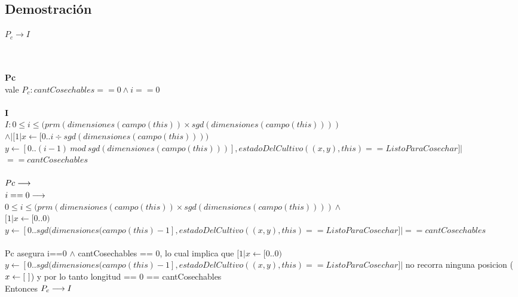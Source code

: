 \documentclass[a4paper]{article}
\begin{document}
    \subsection{Demostraci\'on}
        \noindent
        \begin{large}
       {$P_c \rightarrow I$}
        \end{large} \\
        \\
        \textbf{Pc} \\
        vale $ P_c : cantCosechables == 0 \land i == 0$ \\
        \\
		\textbf{I} \\
        $ I: 0 \leq i \leq (prm(dimensiones(campo(this)) \times sgd(dimensiones(campo(this)))) $\\ $ \land | [1| x \leftarrow [0..i \div sgd(dimensiones(campo(this)))) $\\ $ y \leftarrow [0.. (i-1) \ mod \ sgd(dimensiones(campo(this)))], estadoDelCultivo((x,y), this) == ListoParaCosechar]| $\\$ == cantCosechables $\\   
\\ $Pc \longrightarrow$\\
$i == 0 \longrightarrow$\\
$ 0 \leq i \leq (prm(dimensiones(campo(this)) \times sgd(dimensiones(campo(this)))) \land $\\$
[1| x \leftarrow [0..0) $\\ $ y \leftarrow [0.. sgd(dimensiones(campo(this) - 1], estadoDelCultivo((x,y), this) == ListoParaCosechar]| == cantCosechables$\\
\\ Pc asegura i==0 $ \land $ cantCosechables == 0, lo cual implica que $ [1| x \leftarrow [0..0) $\\ $ y \leftarrow [0.. sgd(dimensiones(campo(this) - 1], estadoDelCultivo((x,y), this) == ListoParaCosechar]|$ no recorra ninguna posicion ( $x \leftarrow [\ ]$) y por lo tanto longitud == 0 == cantCosechables\\
Entonces $P_c \longrightarrow I$
\end{document}
